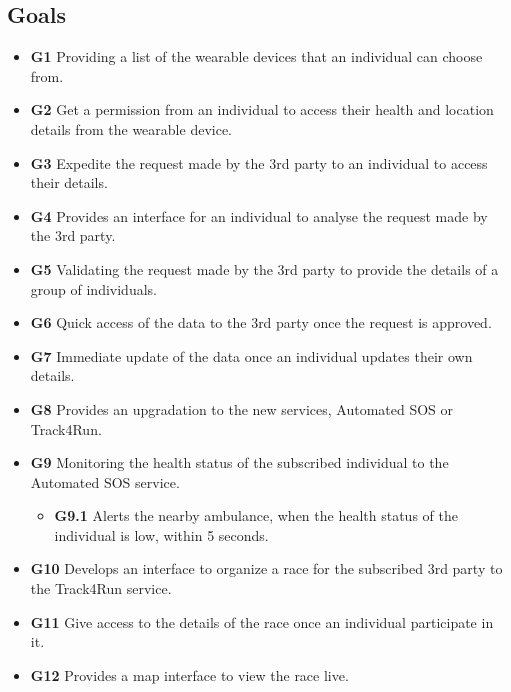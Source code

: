 \subsection{Goals}
\begin{itemize}
\item \textbf{G1} Providing a list of the wearable devices that an individual can choose from.
\item \textbf{G2} Get a permission from an individual to access their health and location details from the wearable device.
\item \textbf{G3} Expedite the request made by the 3rd party to an individual to access their details.
\item \textbf{G4} Provides an interface for an individual to analyse the request made by the 3rd party.
\item \textbf{G5} Validating the request made by the 3rd party to provide the details of a group of individuals.
\item \textbf{G6} Quick access of the data to the 3rd party once the request is approved.
\item \textbf{G7} Immediate update of the data once an individual updates their own details.
\item \textbf{G8} Provides an upgradation to the new services, Automated SOS or Track4Run.
\item \textbf{G9} Monitoring the health status of the subscribed individual to the Automated SOS service.
\begin{itemize}
\item \textbf{G9.1} Alerts the nearby ambulance, when the health status of the individual is low, within 5 seconds.
\end{itemize}
\item \textbf{G10} Develops an interface to organize a race for the subscribed 3rd party to the Track4Run service.
\item \textbf{G11} Give access to the details of the race once an individual participate in it.
\item \textbf{G12} Provides a map interface to view the race live.
\end{itemize}


